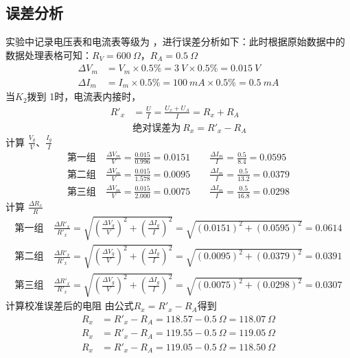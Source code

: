 \documentclass[UTF8]{ctexart}
\begin{document}
\subsection{误差分析}
实验中记录电压表和电流表等级为 ，进行误差分析如下：此时根据原始数据中的数据处理表格可知：$R_V = 600 \ \Omega$，$R_A  = 0.5 \ \Omega$
\begin{align*}
    \Delta V_m &= V_m \times 0.5 \% = 3 \ V \times 0.5\% =  0.015 \ V \\
    \Delta I_m &= I_m \times 0.5 \% = 100 \  mA \times 0.5\% =  0.5 \ mA 
\end{align*}
当$K_2$拨到 1时，电流表内接时，
\begin{align*}
    R'_x &= \frac{U}{I} = \frac{U_x + U_A}{I} = R_x + R_A \\
    &\text{绝对误差为} \ R_x = R'_x - R_A 
\end{align*}
计算 $\frac{V_g}{V}$、$\frac{I_g}{I}$
\begin{align*}
  \text{第一组}& \  \frac{\Delta V_m}{V} = \frac{0.015}{0.996} = 0.0151 \qquad  \frac{\Delta I_m}{I}= \frac{0.5}{8.4}= 0.0595 \\
  \text{第二组}& \  \frac{\Delta V_m}{V} = \frac{0.015}{1.578} = 0.0095 \qquad  \frac{\Delta I_m}{I}= \frac{0.5}{13.2}= 0.0379 \\
  \text{第三组}& \  \frac{\Delta V_m}{V} = \frac{0.015}{2.000} = 0.0075 \qquad  \frac{\Delta I_m}{I}= \frac{0.5}{16.8}= 0.0298
\end{align*}
计算 $\frac{\Delta R_x}{R}$
\begin{align*}
  \text{第一组}& \  \frac{\Delta R'_x}{R'_x} = \sqrt{(\frac{\Delta V_g}{V})^2 + (\frac{\Delta I_g}{I})^2} = \sqrt{(0.0151)^2 + (0.0595)^2} = 0.0614  \\
  \text{第二组}& \  \frac{\Delta R'_x}{R'_x} = \sqrt{(\frac{\Delta V_g}{V})^2 + (\frac{\Delta I_g}{I})^2} = \sqrt{(0.0095)^2 + (0.0379)^2} = 0.0391\\
  \text{第三组}& \  \frac{\Delta R'_x}{R'_x} = \sqrt{(\frac{\Delta V_g}{V})^2 + (\frac{\Delta I_g}{I})^2} = \sqrt{(0.0075)^2 + (0.0298)^2} = 0.0307
\end{align*}
计算校准误差后的电阻 由公式$R_x = R'_x - R_A$得到
\begin{align*}
    R_x &= R'_x - R_A  = 118.57 - 0.5 \ \Omega = 118.07 \ \Omega \\
    R_x &= R'_x - R_A  = 119.55 - 0.5 \ \Omega = 119.05 \ \Omega \\
    R_x &= R'_x - R_A  = 119.05 - 0.5 \ \Omega = 118.50 \ \Omega 
\end{align*}
\end{document}

